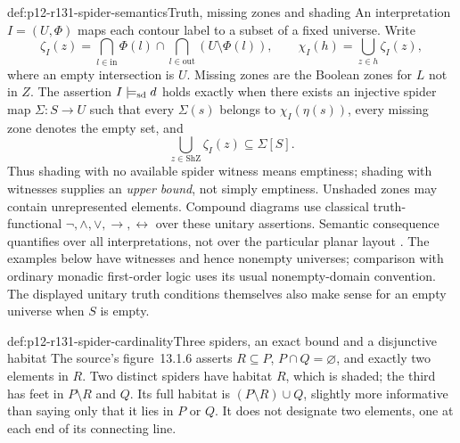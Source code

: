 \begin{hbdefinition}{def:p12-r131-spider-semantics}{Truth, missing zones and shading}
An interpretation \(I=(U,\Phi)\) maps each contour label to a subset
of a fixed universe. Write
\[
 \zeta_I(z)=\bigcap_{l\in\mathrm{in}}\Phi(l)
       \cap\bigcap_{l\in\mathrm{out}}(U\setminus\Phi(l)),
 \qquad \chi_I(h)=\bigcup_{z\in h}\zeta_I(z),
\]
where an empty intersection is \(U\). Missing zones are the Boolean
zones for \(L\) not in \(Z\). The assertion \(I\models_{\rm sd}d\)
holds exactly when there exists an injective spider map
\(\Sigma:S\to U\) such that every \(\Sigma(s)\) belongs to
\(\chi_I(\eta(s))\), every missing zone denotes the empty set, and
\[
 \bigcup_{z\in\mathrm{ShZ}}\zeta_I(z)\subseteq\Sigma[S].
\]
Thus shading with no available spider witness means emptiness; shading
with witnesses supplies an \emph{upper bound}, not simply emptiness.
Unshaded zones may contain unrepresented elements. Compound diagrams use
classical truth-functional \(\neg,\land,\lor,\to,\leftrightarrow\)
over these unitary assertions. Semantic consequence quantifies over all
interpretations, not over the particular planar layout
\cite[pp.~493--495]{UrbasJamnikStapleton2015Speedith}.
The examples below have witnesses and hence nonempty universes; comparison
with ordinary monadic first-order logic uses its usual nonempty-domain
convention. The displayed unitary truth conditions themselves also make
sense for an empty universe when \(S\) is empty.
\end{hbdefinition}

\begin{hbexample}{def:p12-r131-spider-cardinality}{Three spiders, an exact bound and a disjunctive habitat}
The source's figure~13.1.6 asserts \(R\subseteq P\),
\(P\cap Q=\varnothing\), and exactly two elements in \(R\).
Two distinct spiders have habitat \(R\), which is shaded; the third
has feet in \(P\setminus R\) and \(Q\). Its full habitat is
\((P\setminus R)\cup Q\), slightly more informative than saying
only that it lies in \(P\) or \(Q\). It does not designate two
elements, one at each end of its connecting line.
\end{hbexample}

